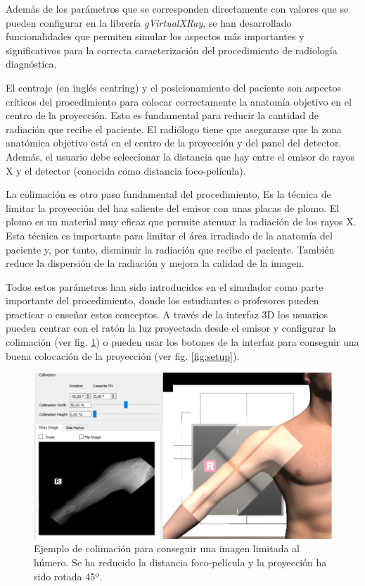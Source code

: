 Además de los parámetros que se corresponden directamente con valores que se pueden configurar en la librería \emph{gVirtualXRay}, se han desarrollado funcionalidades que permiten simular los aspectos más importantes y significativos para la correcta caracterización del procedimiento de radiología diagnóstica. 

El centraje (en inglés centring) y el posicionamiento del paciente son aspectos críticos del procedimiento para colocar correctamente la anatomía objetivo en el centro de la proyección. Esto es fundamental para reducir la cantidad de radiación que recibe el paciente. El radiólogo tiene que asegurarse que la zona anatómica objetivo está en el centro de la proyección y del panel del detector. Además, el usuario debe seleccionar la distancia que hay entre el emisor de rayos X y el detector (conocida como distancia foco-película).

La colimación es otro paso fundamental del procedimiento. Es la técnica de limitar la proyección del haz saliente del emisor con unas placas de plomo. El plomo es un material muy eficaz que permite atenuar la radiación de los rayos X. Esta técnica es importante para limitar el área irradiado de la anatomía del paciente y, por tanto,  disminuir la radiación que recibe el paciente. También reduce la dispersión de la radiación y mejora la calidad de la imagen.

Todos estos parámetros han sido introducidos en el simulador como parte importante del procedimiento, donde los estudiantes o profesores pueden practicar o enseñar estos conceptos. A través de la interfaz 3D los usuarios pueden centrar con el ratón la luz proyectada desde el emisor y configurar la colimación (ver fig. \ref{fig:collimation}) o pueden usar los botones de la interfaz para conseguir una buena colocación de la proyección (ver fig. \ref{fig:setup}).

\begin{figure}[tb]
\centering
\includegraphics[width=0.9\linewidth]{IMG/collimation.png}
\caption{\label{fig:collimation} Ejemplo de colimación para conseguir una imagen limitada al húmero. Se ha reducido la distancia foco-película y la proyección ha sido rotada  45º. }
\end{figure}

